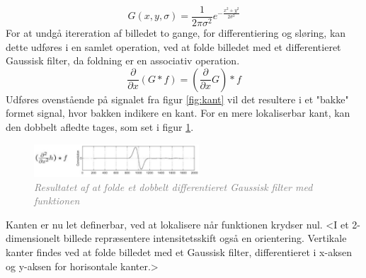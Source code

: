 \begin{equation}
G(x,y,\sigma) = \frac{1}{2 \pi \sigma ^{2}} e^{- \frac{x^{2} + y^{2}}{2 \sigma ^{2}}}
\label{2dgaussian}
\end{equation} 
For at undgå itereration af billedet to gange, for differentiering og sløring, kan dette udføres i en samlet operation, ved at folde billedet med et differentieret Gaussisk filter, da foldning er en associativ operation.
\begin{equation}
\dfrac{\partial}{\partial x}(G \ast f) = (\dfrac{\partial}{\partial x}G) \ast f
\end{equation}
Udføres ovenstående på signalet fra figur \ref{fig:kant} vil det resultere i et "bakke" formet signal, hvor bakken indikere en kant. For en mere lokaliserbar kant, kan den dobbelt afledte tages, som set i figur \ref{fig:deriv}.
\begin{figure}[H]
    \centering
    \includegraphics[width=0.55\textwidth]{fig/8.png}
    \vspace{-1em}   
    \begin{center}
    \caption{\textcolor{gray}{\footnotesize \textit{
     Resultatet af at folde et dobbelt differentieret Gaussisk filter med funktionen}}}
    \label{fig:deriv}
     \end{center}
    \vspace{-2.5em}  
  \end{figure}
\noindent
Kanten er nu let definerbar, ved at lokalisere når funktionen krydser nul. <I et 2-dimensionelt billede repræsentere intensitetsskift også en orientering. Vertikale kanter findes ved at folde billedet med et Gaussisk filter, differentieret i x-aksen og y-aksen for horisontale kanter.>

